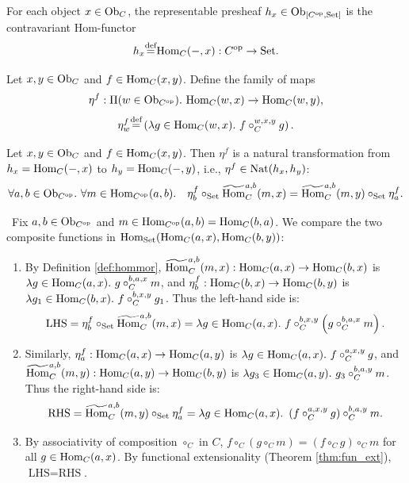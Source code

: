 \documentclass[10pt,a4paper]{article}
\begin{document}
\begin{definition}
For each object $x \in {\textrm{Ob}}_C$, the representable presheaf $h_x \in {\textrm{Ob}}_{[C^{\textrm{op}},{\textrm{Set}}]}$ is the contravariant Hom-functor
$$h_x {\stackrel{{\textrm{def}}}{=}} {\textrm{Hom}}_C(-, x) : C^{\textrm{op}} \to {\textrm{Set}}.$$
\end{definition}

\begin{definition}
Let $x, y \in {\textrm{Ob}}_C$ and $f \in {\textrm{Hom}}_C(x,y)$. Define the family of maps
$$\eta^f : \Pi(w\in \Ob_{C^\op}).\ \Hom_C(w,x)\to \Hom_C(w,y),$$
$$\eta^f_w \eqdef \left(\lambda g\in\Hom_C(w,x).\ f\circ_C^{w,x,y} g\right).$$
\end{definition}

\begin{lemma}\label{lem:eta_nat}
Let $x,y \in {\textrm{Ob}}_C$ and $f \in {\textrm{Hom}}_C(x,y)$. Then $\eta^f$ is a natural transformation from $h_x = {\textrm{Hom}}_C(-,x)$ to $h_y = {\textrm{Hom}}_C(-,y)$, i.e., $\eta^f \in {\textrm{Nat}}(h_x, h_y)$:
$$\forall a,b\in {\textrm{Ob}}_{C^{\textrm{op}}}.\ \forall m\in {\textrm{Hom}}_{C^{\textrm{op}}}(a,b).\quad \eta^f_b \circ_{\textrm{Set}} {\widetilde{{\textrm{Hom}}}\textrm{}}_C^{a,b}(m,x) = {\widetilde{{\textrm{Hom}}}\textrm{}}_C^{a,b}(m,y)\circ_{\textrm{Set}}\eta^f_a.$$
\end{lemma}
\myprf\ Fix $a, b \in {\textrm{Ob}}_{C^{\textrm{op}}}$ and $m \in {\textrm{Hom}}_{C^{\textrm{op}}}(a,b) = {\textrm{Hom}}_C(b,a)$. We compare the two composite functions in ${\textrm{Hom}}_{\textrm{Set}}({\textrm{Hom}}_C(a,x), {\textrm{Hom}}_C(b,y))$:
\begin{enumerate}
\item By Definition \ref{def:hommor}, ${\widetilde{{\textrm{Hom}}}\textrm{}}_C^{a,b}(m,x) : {\textrm{Hom}}_C(a,x) \to {\textrm{Hom}}_C(b,x)$ is $\lambda g \in {\textrm{Hom}}_C(a,x).\ g \circ_C^{b,a,x} m$, and $\eta^f_b : {\textrm{Hom}}_C(b,x) \to {\textrm{Hom}}_C(b,y)$ is $\lambda g_1 \in {\textrm{Hom}}_C(b,x).\ f \circ_C^{b,x,y} g_1$. Thus the left-hand side is:
$$\textrm{LHS} = \eta^f_b \circ_{\textrm{Set}} {\widetilde{{\textrm{Hom}}}\textrm{}}_C^{a,b}(m,x) = \lambda g \in {\textrm{Hom}}_C(a,x).\ f \circ_C^{b,x,y} \left(g \circ_C^{b,a,x} m\right).$$
\item Similarly, $\eta^f_a : {\textrm{Hom}}_C(a,x) \to {\textrm{Hom}}_C(a,y)$ is $\lambda g \in {\textrm{Hom}}_C(a,x).\ f \circ_C^{a,x,y} g$, and ${\widetilde{{\textrm{Hom}}}\textrm{}}_C^{a,b}(m,y) : {\textrm{Hom}}_C(a,y) \to {\textrm{Hom}}_C(b,y)$ is $\lambda g_3 \in {\textrm{Hom}}_C(a,y).\ g_3 \circ_C^{b,a,y} m$. Thus the right-hand side is:
$$\textrm{RHS} = {\widetilde{{\textrm{Hom}}}\textrm{}}_C^{a,b}(m,y) \circ_{\textrm{Set}} \eta^f_a = \lambda g \in {\textrm{Hom}}_C(a,x).\ \left(f \circ_C^{a,x,y} g\right) \circ_C^{b,a,y} m.$$
\item By associativity of composition $\circ_C$ in $C$, $f \circ_C (g \circ_C m) = (f \circ_C g) \circ_C m$ for all $g \in {\textrm{Hom}}_C(a,x)$. By functional extensionality (Theorem \ref{thm:fun_ext}), $\textrm{LHS} = \textrm{RHS}$.
\end{enumerate}
\end{document}
